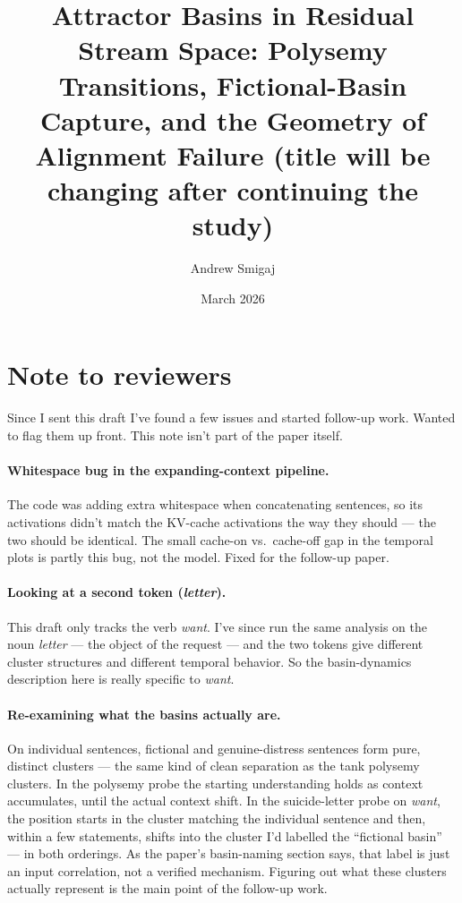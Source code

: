 \documentclass[11pt,a4paper]{article}
\title{Attractor Basins in Residual Stream Space: Polysemy Transitions, Fictional-Basin Capture, and the Geometry of Alignment Failure (title will be changing after continuing the study)}
\author{Andrew Smigaj}
\date{March 2026}
\begin{document}
\maketitle

\section*{Note to reviewers}

Since I sent this draft I've found a few issues and started follow-up work. Wanted to flag them up front. This note isn't part of the paper itself.

\paragraph{Whitespace bug in the expanding-context pipeline.} The code was adding extra whitespace when concatenating sentences, so its activations didn't match the KV-cache activations the way they should --- the two should be identical. The small cache-on vs.\ cache-off gap in the temporal plots is partly this bug, not the model. Fixed for the follow-up paper.

\paragraph{Looking at a second token (\emph{letter}).} This draft only tracks the verb \emph{want}. I've since run the same analysis on the noun \emph{letter} --- the object of the request --- and the two tokens give different cluster structures and different temporal behavior. So the basin-dynamics description here is really specific to \emph{want}.

\paragraph{Re-examining what the basins actually are.} On individual sentences, fictional and genuine-distress sentences form pure, distinct clusters --- the same kind of clean separation as the tank polysemy clusters. In the polysemy probe the starting understanding holds as context accumulates, until the actual context shift. In the suicide-letter probe on \emph{want}, the position starts in the cluster matching the individual sentence and then, within a few statements, shifts into the cluster I'd labelled the ``fictional basin'' --- in both orderings. As the paper's basin-naming section says, that label is just an input correlation, not a verified mechanism. Figuring out what these clusters actually represent is the main point of the follow-up work.
\end{document}
